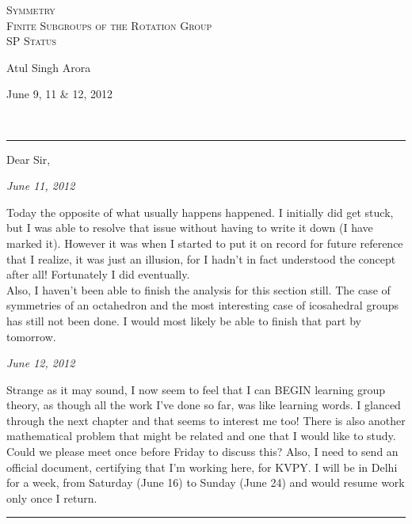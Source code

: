 \documentclass[12pt]{article}
\begin{document}



\begin{center}
\textsc{{\huge Symmetry\\}
Finite Subgroups of the Rotation Group\\
\small SP Status\\}
\begin{minipage}{0.4\textwidth}
\begin{flushleft} Atul Singh Arora \end{flushleft}
\end{minipage}
\begin{minipage}{0.4\textwidth}
\begin{flushright} {\small June 9, 11 \& 12, 2012} \end{flushright}
\end{minipage}
\\
\end{center}
\hrule
Dear Sir,
\par
{\emph{\small June 11, 2012}}
\par
Today the opposite of what usually happens happened. I initially did get stuck, but I was able to resolve that issue without having to write it down (I have marked it). However it was when I started to put it on record for future reference that I realize, it was just an illusion, for I hadn't in fact understood the concept after all! Fortunately I did eventually.\\
Also, I haven't been able to finish the analysis for this section still. The case of symmetries of an octahedron and the most interesting case of icosahedral groups has still not been done. I would most likely be able to finish that part by tomorrow.
\par
{\emph{\small June 12, 2012}}
\par
Strange as it may sound, I now seem to feel that I can BEGIN learning group theory, as though all the work I've done so far, was like learning words. I glanced through the next chapter and that seems to interest me too! There is also another mathematical problem that might be related and one that I would like to study. Could we please meet once before Friday to discuss this? Also, I need to send an official document, certifying that I'm working here, for KVPY. I will be in Delhi for a week, from Saturday (June 16) to Sunday (June 24) and would resume work only once I return.
\\
\hrule
\vspace{12pt}
\end{document}
